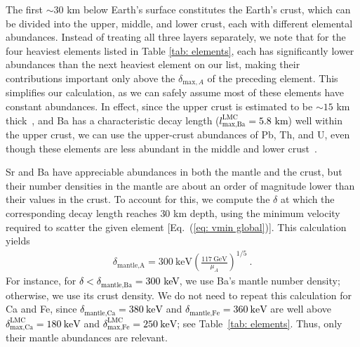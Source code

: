 \documentclass[aps,prd,amsmath,amssymb,10pt,letterpaper,balancelastpage,showpacs,superscriptaddress,nofootinbib,floatfix,notitlepage,longbibliography,twocolumn
]{revtex4-2}
\newcommand{\numcolor}[1]{\textcolor{black}{#1}}
\newcommand{\Eq}[1]{Eq.~(#1)}
\newcommand{\deltamaxA}{\delta_{\text{max},A}}
\newcommand{\deltamaxLMC}[1]{\delta^{\text{LMC}}_{\text{max},\text{#1}}}
\newcommand{\lmaxLMC}[1]{l^{\text{LMC}}_{\text{max,#1}}}
\begin{document}
The first $\sim 30$ km below Earth's surface constitutes the Earth's crust, which can be divided into the upper, middle, and lower crust, each with different elemental abundances. Instead of treating all three layers separately, we note that for the four heaviest elements listed in Table \ref{tab: elements}, each has significantly lower abundances than the next heaviest element on our list, making their contributions important only above the $\deltamaxA$ of the preceding element. This simplifies our calculation, as we can safely assume most of these elements have constant abundances. In effect, since the upper crust is estimated to be $\sim 15$ km thick~\cite{Composition_Crust}, and Ba has a characteristic decay length (\numcolor{$\lmaxLMC{Ba} = 5.8$ km}) well within the upper crust, we can use the upper-crust abundances of Pb, Th, and U, even though these elements are less abundant in the middle and lower crust~\cite{Composition_Crust}.

Sr and Ba have appreciable abundances in both the mantle and the crust, but their number densities in the mantle are about an order of magnitude lower than their values in the crust. To account for this, we compute the $\delta$ at which the corresponding decay length reaches $30$ km depth, using the minimum velocity required to scatter the given element [\Eq{\ref{eq: vmin global}}]. This calculation yields
\begin{align}
    \delta_{\text{mantle,A}} = 300~\text{keV} \left(\frac{117~\text{GeV}}{\mu_A}\right)^{1/5} ~.
\end{align}
For instance, for \numcolor{$\delta<\delta_{\text{mantle,Ba}}=300$ keV}, we use Ba’s mantle number density; otherwise, we use its crust density. We do not need to repeat this calculation for Ca and Fe, since \numcolor{$\delta_{\text{mantle,Ca}}=380~\text{keV}$} and \numcolor{$\delta_{\text{mantle,Fe}}=360~\text{keV}$} are well above \numcolor{$\deltamaxLMC{Ca} = 180~\text{keV}$} and \numcolor{$\deltamaxLMC{Fe} = 250~\text{keV}$}; see Table~\ref{tab: elements}. Thus, only their mantle abundances are relevant.




\end{document}
